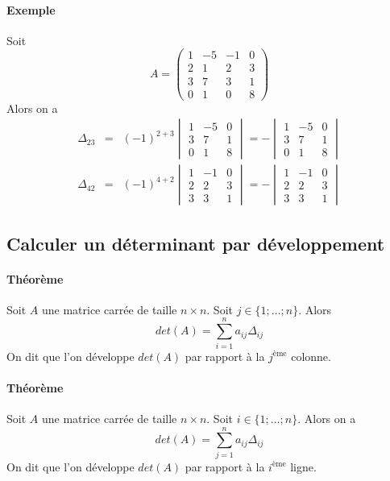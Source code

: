 \paragraph{Exemple} Soit
$$A = \begin{pmatrix}
  1 & -5 & -1 & 0 \\
  2 & 1 & 2 & 3 \\
  3 & 7 & 3 & 1 \\
  0 & 1 & 0 & 8
\end{pmatrix}$$
Alors on a
\begin{eqnarray*}
  \Delta_{23} &=& (-1)^{2+3} \begin{vmatrix} 1 & -5 & 0 \\ 3 & 7 & 1 \\ 0 & 1 & 8 \end{vmatrix}
    = - \begin{vmatrix} 1 & -5 & 0 \\ 3 & 7 & 1 \\ 0 & 1 & 8 \end{vmatrix} \\
  \Delta_{42} &=& (-1)^{4 + 2} \begin{vmatrix} 1 & -1 & 0 \\ 2 & 2 & 3 \\ 3 & 3 & 1 \end{vmatrix}
    = - \begin{vmatrix} 1 & -1 & 0 \\ 2 & 2 & 3 \\ 3 & 3 & 1 \end{vmatrix}
\end{eqnarray*}

%
\subsection{Calculer un déterminant par développement}
%
\paragraph{Théorème} Soit $A$ une matrice carrée de taille $n\times n$. Soit $j \in \{1; \ldots; n\}$. Alors
$$det(A) = \sum_{i=1}^{n} a_{ij} \Delta_{ij}$$
On dit que l'on développe $det(A)$ par rapport à la $j^{\text{ème}}$ colonne.

\paragraph{Théorème} Soit $A$ une matrice carrée de taille $n\times n$. Soit $i \in \{1; \ldots; n\}$. Alors on a
$$det(A) = \sum_{j=1}^{n} a_{ij} \Delta_{ij}$$
On dit que l'on développe $det(A)$ par rapport à la $i^{\text{ème}}$ ligne.

